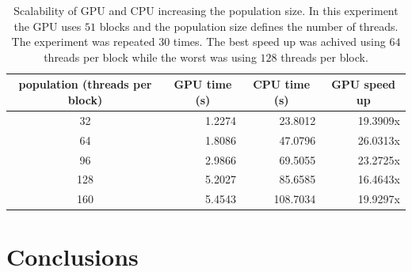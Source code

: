 \documentclass[conference]{IEEEtran}
\begin{document}
    \begin{table}[!t]
        \centering
        \caption{Scalability of GPU and CPU increasing the population size. In this experiment the GPU uses $51$ blocks and the population size defines the number of threads. The experiment was repeated $30$ times. The best speed up was achived using $64$ threads per block while the worst was using $128$ threads per block.}
        \label{tbl:scalability}
        \begin{tabular}{|c|r|r|r|}
        \hline
        \textbf{population (threads per block)} & \multicolumn{1}{c|}{\textbf{GPU time (s)}} & \multicolumn{1}{c|}{\textbf{CPU time (s)}} & \multicolumn{1}{c|}{\textbf{GPU speed up}} \\ \hline
        32                       & 1.2274                                     & 23.8012                                    & 19.3909x                                   \\ \hline
        64                       & 1.8086                                     & 47.0796                                    & 26.0313x                                   \\ \hline
        96                       & 2.9866                                     & 69.5055                                    & 23.2725x                                   \\ \hline
        128                      & 5.2027                                     & 85.6585                                    & 16.4643x                                   \\ \hline
        160                      & 5.4543                                     & 108.7034                                   & 19.9297x                                   \\ \hline
        \end{tabular}
    \end{table}


    \section{Conclusions}
\end{document}
